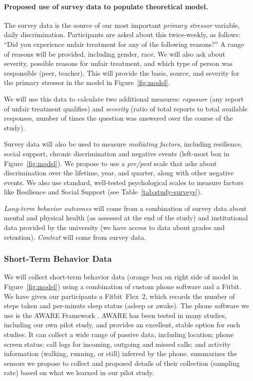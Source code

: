 \paragraph{Proposed use of survey data to populate theoretical model.} 
The survey data is the source of our most important \textit{primary stressor} variable, daily discrimination. Participants are asked about this twice-weekly, as follows: ``Did you experience unfair treatment for any of the following reasons?'' A range of reasons will be provided, including gender, race, \etc We will also ask about severity, possible reasons for unfair treatment, and which type of person was responsible (\eg peer, teacher). This will provide the basis, source, and severity for the primary stressor in the model in Figure~\ref{fig:model}.

We will use this data to calculate two additional measures:  \textit{exposure} (any report of unfair treatment qualifies) and \textit{severity} (ratio of total reports to total available responses, \ie number of times the question was answered over the course of the study). 

Survey data will also be used to measure \textit{mediating factors}, including resilience, social support, chronic discrimination and negative events (left-most box in Figure~\ref{fig:model}). We propose to use a  \textit{pre/post} scale that asks about discrimination over the lifetime, year, and quarter, along with other negative events. We also use standard, well-tested psychological scales to measure factors like Resilience and Social Support (see Table~\ref{tab:study-surveys}). 

\textit{Long-term behavior outcomes} will come from a combination of survey data about mental and physical health (as assessed at the end of the study) and institutional data provided by the university (we have access to data about grades and retention). \textit{Context} will come from survey data.

\subsubsection{Short-Term Behavior Data}
We will collect short-term behavior data (orange box on right side of model in Figure~\ref{fig:model}) using a combination of custom phone software and a Fitbit. We have given our participants a Fitbit~Flex~2, which records the number of steps taken and per-minute sleep status (\eg asleep or awake). The phone software we use is the AWARE Framework \cite{Ferreira:2015}. AWARE has been tested in many studies, including our own pilot study, and provides an excellent, stable option for such studies. It can collect a wide range of passive data, including  
location; phone screen status; call logs for incoming, outgoing and missed calls; and activity information (\eg walking, running, or still) inferred by the phone. 
 summarizes the sensors we propose to collect and proposed details of their collection (\eg sampling rate) based on what we learned in our pilot study. 

